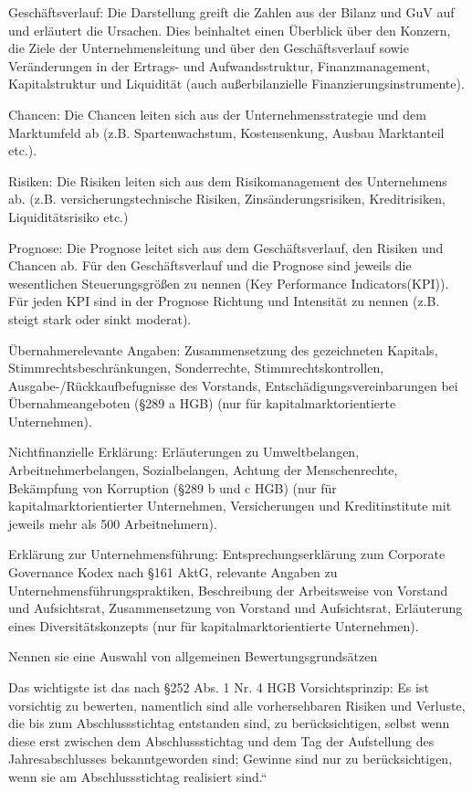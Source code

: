 Geschäftsverlauf: 
Die Darstellung greift die Zahlen aus der Bilanz und GuV auf und erläutert die Ursachen. Dies beinhaltet einen Überblick über den Konzern, die Ziele der
Unternehmensleitung und über den Geschäftsverlauf sowie Veränderungen in der Ertrags- und Aufwandsstruktur, Finanzmanagement, Kapitalstruktur und Liquidität (auch außerbilanzielle Finanzierungsinstrumente).

Chancen: 
Die Chancen leiten sich aus der Unternehmensstrategie und dem Marktumfeld ab (z.B. Spartenwachstum, Kostensenkung, Ausbau Marktanteil etc.).

Risiken: 
Die Risiken leiten sich aus dem Risikomanagement des Unternehmens ab.
(z.B. versicherungstechnische Risiken, Zinsänderungsrisiken, Kreditrisiken, Liquiditätsrisiko etc.)

Prognose: 
Die Prognose leitet sich aus dem Geschäftsverlauf, den Risiken und Chancen ab. Für den Geschäftsverlauf und die Prognose sind jeweils die wesentlichen
Steuerungsgrößen zu nennen (Key Performance Indicators(KPI)). Für jeden KPI sind in der Prognose Richtung und Intensität zu nennen
(z.B. steigt stark oder sinkt moderat).

Übernahmerelevante Angaben:
Zusammensetzung des gezeichneten Kapitals, Stimmrechtsbeschränkungen, Sonderrechte, Stimmrechtskontrollen, Ausgabe-/Rückkaufbefugnisse des Vorstands,
Entschädigungsvereinbarungen bei Übernahmeangeboten (§289 a HGB) (nur für kapitalmarktorientierte Unternehmen).

Nichtfinanzielle Erklärung: 
Erläuterungen zu Umweltbelangen, Arbeitnehmerbelangen, Sozialbelangen, Achtung der Menschenrechte, Bekämpfung von Korruption (§289 b und c HGB) (nur für
kapitalmarktorientierter Unternehmen, Versicherungen und Kreditinstitute mit jeweils mehr als 500 Arbeitnehmern).

Erklärung zur Unternehmensführung:
Entsprechungserklärung zum Corporate Governance Kodex nach §161 AktG, relevante Angaben zu Unternehmensführungspraktiken, Beschreibung der Arbeitsweise
von Vorstand und Aufsichtsrat, Zusammensetzung von Vorstand und Aufsichtsrat, Erläuterung eines Diversitätskonzepts (nur für kapitalmarktorientierte Unternehmen).



Nennen sie eine Auswahl von allgemeinen Bewertungsgrundsätzen

Das wichtigste ist das nach §252 Abs. 1 Nr. 4 HGB
Vorsichtsprinzip:
    Es ist vorsichtig zu bewerten, namentlich sind alle vorhersehbaren Risiken und Verluste, die bis zum Abschlussstichtag
    entstanden sind, zu berücksichtigen, selbst wenn diese erst zwischen dem Abschlussstichtag und dem Tag der Aufstellung
    des Jahresabschlusses bekanntgeworden sind; Gewinne sind nur zu berücksichtigen, wenn sie am Abschlussstichtag
    realisiert sind.“

